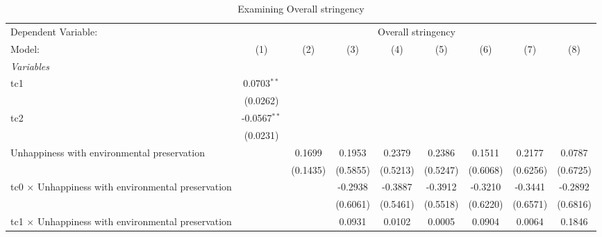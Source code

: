 
\begin{table}[htbp]
   \caption{Examining Overall stringency}
   \centering
   \begin{tabular}{lcccccccc}
      \tabularnewline \midrule \midrule
      Dependent Variable: & \multicolumn{8}{c}{Overall stringency}\\
      Model:                                                    & (1)            & (2)      & (3)      & (4)           & (5)           & (6)           & (7)           & (8)\\  
      \midrule
      \emph{Variables}\\
      tc1                                                       & 0.0703$^{**}$  &          &          &               &               &               &               &   \\   
                                                                & (0.0262)       &          &          &               &               &               &               &   \\   
      tc2                                                       & -0.0567$^{**}$ &          &          &               &               &               &               &   \\   
                                                                & (0.0231)       &          &          &               &               &               &               &   \\   
      Unhappiness with environmental preservation               &                & 0.1699   & 0.1953   & 0.2379        & 0.2386        & 0.1511        & 0.2177        & 0.0787\\   
                                                                &                & (0.1435) & (0.5855) & (0.5213)      & (0.5247)      & (0.6068)      & (0.6256)      & (0.6725)\\   
      tc0 $\times$ Unhappiness with environmental preservation  &                &          & -0.2938  & -0.3887       & -0.3912       & -0.3210       & -0.3441       & -0.2892\\   
                                                                &                &          & (0.6061) & (0.5461)      & (0.5518)      & (0.6220)      & (0.6571)      & (0.6816)\\   
      tc1 $\times$ Unhappiness with environmental preservation  &                &          & 0.0931   & 0.0102        & 0.0005        & 0.0904        & 0.0064        & 0.1846\\   

\end{tabular}
\end{table}
